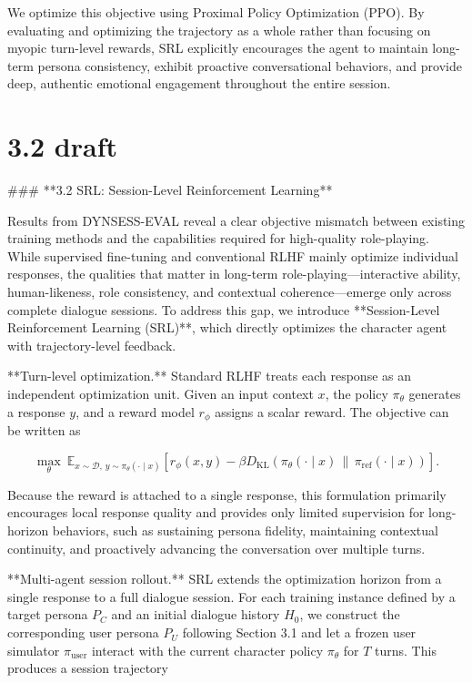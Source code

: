 We optimize this objective using Proximal Policy Optimization (PPO). By evaluating and optimizing the trajectory as a whole rather than focusing on myopic turn-level rewards, \textsc{SRL} explicitly encourages the agent to maintain long-term persona consistency, exhibit proactive conversational behaviors, and provide deep, authentic emotional engagement throughout the entire session.



\section{3.2 draft}
### **3.2 SRL: Session-Level Reinforcement Learning**

Results from DYNSESS-EVAL reveal a clear objective mismatch between existing training methods and the capabilities required for high-quality role-playing. While supervised fine-tuning and conventional RLHF mainly optimize individual responses, the qualities that matter in long-term role-playing—interactive ability, human-likeness, role consistency, and contextual coherence—emerge only across complete dialogue sessions. To address this gap, we introduce **Session-Level Reinforcement Learning (SRL)**, which directly optimizes the character agent with trajectory-level feedback.

**Turn-level optimization.**  
Standard RLHF treats each response as an independent optimization unit. Given an input context \(x\), the policy \(\pi_\theta\) generates a response \(y\), and a reward model \(r_\phi\) assigns a scalar reward. The objective can be written as

\[
\max_\theta \ \mathbb{E}_{x \sim \mathcal{D},\, y \sim \pi_\theta(\cdot \mid x)}
\left[
r_\phi(x,y)
-
\beta D_{\mathrm{KL}}\!\left(
\pi_\theta(\cdot \mid x)\,\|\,\pi_{\mathrm{ref}}(\cdot \mid x)
\right)
\right].
\]

Because the reward is attached to a single response, this formulation primarily encourages local response quality and provides only limited supervision for long-horizon behaviors, such as sustaining persona fidelity, maintaining contextual continuity, and proactively advancing the conversation over multiple turns.

**Multi-agent session rollout.**  
SRL extends the optimization horizon from a single response to a full dialogue session. For each training instance defined by a target persona \(P_C\) and an initial dialogue history \(H_0\), we construct the corresponding user persona \(P_U\) following Section 3.1 and let a frozen user simulator \(\pi_{\mathrm{user}}\) interact with the current character policy \(\pi_\theta\) for \(T\) turns. This produces a session trajectory

